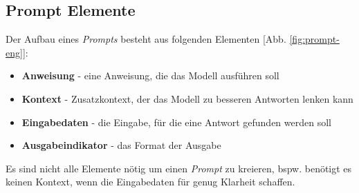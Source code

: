 \subsection{Prompt Elemente}
Der Aufbau eines \textit{Prompts} besteht aus folgenden Elementen [Abb. \ref{fig:prompt-eng}]:
\begin{itemize}
    \setlength{\parskip}{1pt}
    \item \textbf{Anweisung} - eine Anweisung, die das Modell ausführen soll
    \item \textbf{Kontext} - Zusatzkontext, der das Modell zu besseren Antworten lenken kann
    \item \textbf{Eingabedaten} - die Eingabe, für die eine Antwort gefunden werden soll
    \item \textbf{Ausgabeindikator} - das Format der Ausgabe
\end{itemize}
Es sind nicht alle Elemente nötig um einen \textit{Prompt} zu kreieren, bspw. benötigt es keinen Kontext, wenn die Eingabedaten für genug Klarheit schaffen. \cite*{ElementsPromptNextra2024}

